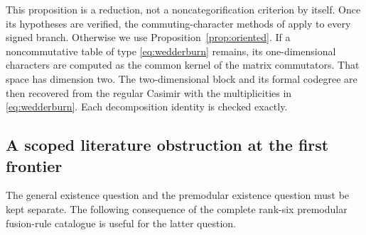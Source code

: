 This proposition is a reduction, not a noncategorification criterion by
itself. Once its hypotheses are verified, the commuting-character
methods of \cite{DP4,DP5} apply to every signed branch. Otherwise we use
Proposition~\ref{prop:oriented}. If a noncommutative table of type
\eqref{eq:wedderburn} remains, its one-dimensional characters are
computed as the common kernel of the matrix commutators. That space has
dimension two. The two-dimensional block and its formal codegree are
then recovered from the regular Casimir with the multiplicities in
\eqref{eq:wedderburn}. Each decomposition identity is checked exactly.

\subsection{A scoped literature obstruction at the first frontier}
\label{sec:premodular-frontier-bound}

The general existence question and the premodular existence question must
be kept separate. The following consequence of the complete rank-six
premodular fusion-rule catalogue is useful for the latter question.

